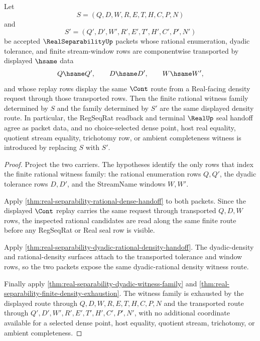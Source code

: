 \begin{theorem}
\label{thm:real-separability-stream-window-stability}
Let
$$
S=(Q,D,W,R,E,T,H,C,P,N)
$$
and
$$
S'=(Q',D',W',R',E',T',H',C',P',N')
$$
be accepted $\RealSeparabilityUp$ packets whose rational enumeration, dyadic tolerance, and finite stream-window rows are componentwise transported by displayed $\hsame$ data
$$
Q \hsame Q',\qquad D \hsame D',\qquad W \hsame W',
$$
and whose replay rows display the same $\Cont$ route from a Real-facing density request through those transported rows. Then the finite rational witness family determined by $S$ and the family determined by $S'$ are the same displayed density route. In particular, the RegSeqRat readback and terminal $\RealUp$ seal handoff agree as packet data, and no choice-selected dense point, host real equality, quotient stream equality, trichotomy row, or ambient completeness witness is introduced by replacing $S$ with $S'$.
\end{theorem}
\begin{proof}
Project the two carriers. The hypotheses identify the only rows that index the finite rational witness family: the rational enumeration rows $Q,Q'$, the dyadic tolerance rows $D,D'$, and the StreamName windows $W,W'$.

Apply \autoref{thm:real-separability-rational-dense-handoff} to both packets. Since the displayed $\Cont$ replay carries the same request through transported $Q,D,W$ rows, the inspected rational candidates are read along the same finite route before any RegSeqRat or Real seal row is visible.

Apply \autoref{thm:real-separability-dyadic-rational-density-handoff}. The dyadic-density and rational-density surfaces attach to the transported tolerance and window rows, so the two packets expose the same dyadic-rational density witness route.

Finally apply \autoref{thm:real-separability-dyadic-witness-family} and \autoref{thm:real-separability-finite-density-exhaustion}. The witness family is exhausted by the displayed route through $Q,D,W,R,E,T,H,C,P,N$ and the transported route through $Q',D',W',R',E',T',H',C',P',N'$, with no additional coordinate available for a selected dense point, host equality, quotient stream, trichotomy, or ambient completeness.
\end{proof}

